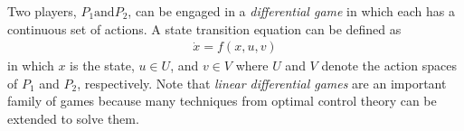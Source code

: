 \documentclass{article}
\begin{document}
Two players, $P_1 \text{and} P_2$, can be engaged in a \textit{differential game} in which each has a continuous set of actions. A state transition equation can be defined as
\begin{align}
    \dot{x} = f(x,u,v)
\end{align}
in which $x$ is the state, $u \in U$, and $v \in V$ where $U$ and $V$ denote the action spaces of $P_1$ and $P_2$, respectively. Note that \textit{linear differential games} are an important family of games because many techniques from optimal control theory can be extended to solve them.
\end{document}
